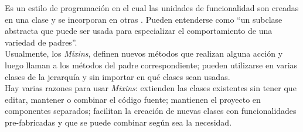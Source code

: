 Es un estilo de programación en el cual las unidades de funcionalidad son creadas en una clase y se incorporan en otras \cite{Mixins}. Pueden entenderse como “un subclase abstracta que puede ser usada para especializar el comportamiento de una variedad de padres”.  \cite{Mixins2} \\

Usualmente, los \textit{Mixins}, definen nuevos métodos que realizan alguna acción y luego llaman a los métodos del padre correspondiente; pueden utilizarse en varias clases de la jerarquía y sin importar en qué clases sean usadas. \\

Hay varias razones para usar \textit{Mixins}: extienden las clases existentes sin tener que editar, mantener o combinar el código fuente; mantienen el proyecto en componentes separados; facilitan la creación de nuevas clases con funcionalidades pre-fabricadas y que se puede combinar según sea la necesidad.\cite{Mixins}

